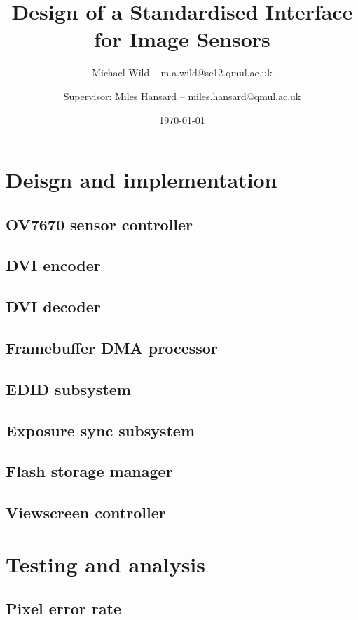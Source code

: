 \documentclass[a4paper,11pt]{report}
\title{Design of a Standardised Interface for Image Sensors}
\author{Michael Wild -- m.a.wild@se12.qmul.ac.uk \and Supervisor: Miles Hansard -- miles.hansard@qmul.ac.uk}
\date{\today}
\begin{document}
  \maketitle
  

  \tableofcontents
  \listoffigures
  \listoftables

  
  
  
  

  \chapter{Deisgn and implementation}
    \section{OV7670 sensor controller}
    \section{DVI encoder}
    \section{DVI decoder}
    \section{Framebuffer DMA processor}
    \section{EDID subsystem}
    \section{Exposure sync subsystem}
    \section{Flash storage manager}
    \section{Viewscreen controller}

  \chapter{Testing and analysis}
    \section{Pixel error rate}
\end{document}
